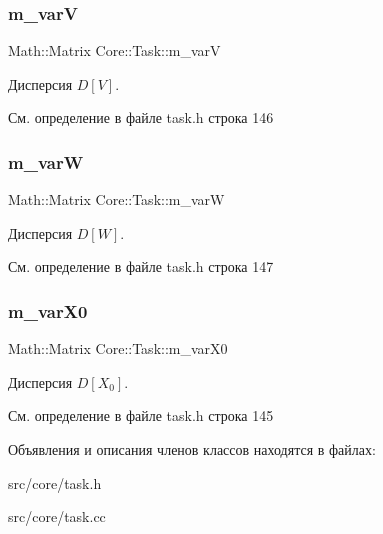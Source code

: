 \subsubsection{\texorpdfstring{m\+\_\+varV}{m\_varV}}
{\footnotesize\ttfamily Math\+::\+Matrix Core\+::\+Task\+::m\+\_\+varV\hspace{0.3cm}{\ttfamily [protected]}}

Дисперсия $D[V]$. 

См. определение в файле task.\+h строка 146

\hypertarget{class_core_1_1_task_af1239e6079214a8344c44b8ad4c3a23e}{}\label{class_core_1_1_task_af1239e6079214a8344c44b8ad4c3a23e} 
\subsubsection{\texorpdfstring{m\+\_\+varW}{m\_varW}}
{\footnotesize\ttfamily Math\+::\+Matrix Core\+::\+Task\+::m\+\_\+varW\hspace{0.3cm}{\ttfamily [protected]}}

Дисперсия $D[W]$. 

См. определение в файле task.\+h строка 147

\hypertarget{class_core_1_1_task_a06a945ef15de5b97494fd20ce88470a6}{}\label{class_core_1_1_task_a06a945ef15de5b97494fd20ce88470a6} 
\subsubsection{\texorpdfstring{m\+\_\+var\+X0}{m\_varX0}}
{\footnotesize\ttfamily Math\+::\+Matrix Core\+::\+Task\+::m\+\_\+var\+X0\hspace{0.3cm}{\ttfamily [protected]}}

Дисперсия $D[X_0]$. 

См. определение в файле task.\+h строка 145



Объявления и описания членов классов находятся в файлах\+:\begin{DoxyCompactItemize}
\item 
src/core/task.\+h\item 
src/core/task.\+cc\end{DoxyCompactItemize}
